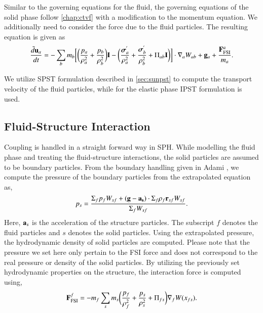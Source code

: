 Similar to the governing equations for the fluid, the governing equations of
the solid phase follow \cref{chap:ctvf} with a modification to the momentum
equation. We additionally need to consider the force due to the
fluid particles. The resulting equation is given as
\begin{multline}
  \label{eq:fsi:sph-momentum-solid}
  \frac{\tilde{d}\mathbf{u}_{a}}{dt} = - \sum_{b} m_b \bigg[
  \bigg(\frac{p_a}{\rho_a^2} + \frac{p_b}{\rho_b^2}\bigg) \mathbf{I} -
  \bigg(\frac{\boldsymbol{\sigma}^{'}_{a}}{\rho_a^2} +
  \frac{\boldsymbol{\sigma}^{'}_{b}}{\rho_b^2} + \Pi_{ab} \mathbf{I} \bigg) \bigg]  \cdot \nabla_{a} W_{ab}
  + \mathbf{g}_{a} + \frac{\mathbf{F}^a_{\text{FSI}}}{m_a}.
\end{multline}

We utilize SPST formulation described in \cref{sec:sunpst} to compute the
transport velocity of the fluid particles, while for the elastic phase
IPST \parencite{huang_kernel_2019} formulation is used.

\subsection{Fluid-Structure Interaction}\label{subsec:fsi}
Coupling is handled in a straight forward way in SPH. While modelling the fluid
phase and treating the fluid-structure interactions, the solid particles are
assumed to be boundary particles. From the boundary handling given in Adami
\parencite{Adami2012}, we compute the pressure of the boundary particles from
the extrapolated equation as,
\begin{equation}
  \label{eq:fsi:pressure-bc}
  p_s = \frac{\Sigma_f p_f W_{sf} + (\mathbf{g} - \mathbf{a}_{\mathbf{s}}) \cdot \Sigma_f
    \rho_f \mathbf{r}_{sf} W_{sf}}{\Sigma_f W_{sf}}.
\end{equation}
Here, $\mathbf{a}_s$ is the acceleration of the structure particles. The subscript
$f$ denotes the fluid particles and $s$ denotes the solid particles. Using the
extrapolated pressure, the hydrodynamic density of solid particles are
computed. Please note that the pressure we set here only pertain to the
FSI force and does not correspond to the real pressure or density of the
solid particles. By utilizing the previously set hydrodynamic properties on
the structure, the interaction force is computed using,
\begin{equation}
  \mathbf{F}_{\text{FSI}}^f = -m_f \sum_{s} m_s \bigg(\frac{p_f}{\rho_{f}^2} +
  \frac{p_s}{\rho_{s}^2} + \Pi_{fs} \bigg) \nabla_{f} W(x_{fs}).
\end{equation}


